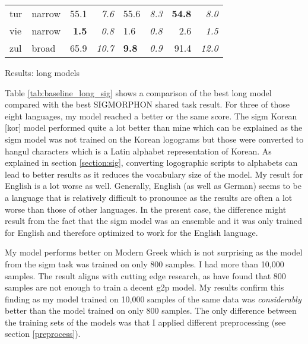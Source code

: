 {\begin{tabularx}{1.2\textwidth}{|l|X||r|r||X|X||r|r|}
tur       & narrow        & 55.1         & \textit{7.6}    & 55.6         & \textit{8.3}          & \textbf{54.8}   & \textit{8.0}    \\
vie       & narrow        & \textbf{1.5} & \textit{0.8}    & 1.6          & \textit{0.8}          & 2.6    & \textit{1.5}    \\
zul       & broad         & 65.9         & \textit{10.7}   & \textbf{9.8}          & \textit{0.9}          & 91.4   & \textit{12.0}   \\ \hline
\end{tabularx}
}{Results: long models}

Table \ref{tab:baseline_long_sig} shows a comparison of the best long model compared with the best SIGMORPHON shared task result. For three of those eight languages, my model reached a better or the same score. The \ac{sigm} Korean [kor] model performed quite a lot better than mine which can be explained as the \ac{sigm} model was not trained on the Korean logograms but those were converted to hangul characters which is a Latin alphabet representation of Korean. As explained in section \ref{section:sig}, converting logographic scripts to alphabets can lead to better results as it reduces the vocabulary size of the model. My result for English is a lot worse as well. Generally, English (as well as German) seems to be a language that is relatively difficult to pronounce as the results are often a lot worse than those of other languages. In the present case, the difference might result from the fact that the \ac{sigm} model was an ensemble and it was only trained for English and therefore optimized to work for the English language. 

My model performs better on Modern Greek which is not surprising as the model from the \ac{sigm} task was trained on only 800 samples. I had more than 10,000 samples. The result aligns with cutting edge research, as \citet{Ashby-Bartley.2021} have found that 800 samples are not enough to train a decent \ac{g2p} model. My results confirm this finding as my model trained on 10,000 samples of the same data was \textit{considerably} better than the model trained on only 800 samples. The only difference between the training sets of the models was that I applied different preprocessing (see section \ref{preprocess}). 

